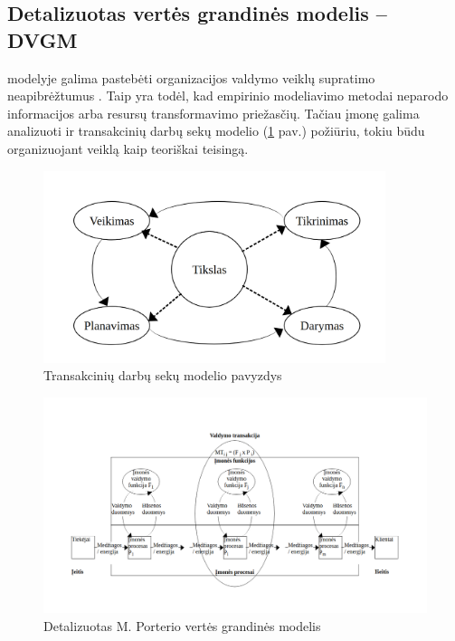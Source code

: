 \subsection{Detalizuotas vertės grandinės modelis – DVGM} \label{section:dvcm}

\BPMN{} modelyje galima pastebėti organizacijos valdymo veiklų supratimo neapibrėžtumus \cite{bpmnPorterModel}. Taip yra todėl, kad empirinio modeliavimo metodai neparodo informacijos arba resursų transformavimo priežasčių. Tačiau įmonę galima analizuoti ir transakcinių darbų sekų modelio (\ref{img:pdca} pav.) požiūriu, tokiu būdu organizuojant veiklą kaip teoriškai teisingą.

\begin{figure}[H]
	\centering
	\includegraphics[width=10cm]{img/pdca}
	\caption{Transakcinių darbų sekų modelio pavyzdys}
	\label{img:pdca}
\end{figure}

\begin{figure}[H]
	\centering
	\includegraphics[width=\textwidth]{img/detalized_porter_vcm}
	\caption{Detalizuotas M. Porterio vertės grandinės modelis}
	\label{img:detalized_porter_vcm}
\end{figure}

